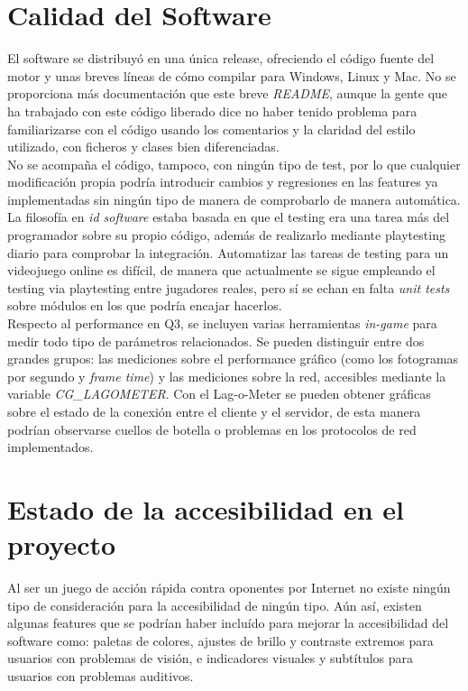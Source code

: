 \documentclass[a4paper,12pt]{report}
\begin{document}
	
	\section{Calidad del Software}
    El software se distribuyó en una única release, ofreciendo el código fuente del motor y unas breves líneas de cómo compilar para Windows, Linux y Mac. No se proporciona más documentación que este breve \textit{README}, aunque la gente que ha trabajado con este código liberado dice no haber tenido problema para familiarizarse con el código usando los comentarios y la claridad del estilo utilizado, con ficheros y clases bien diferenciadas.\\
    
    No se acompaña el código, tampoco, con ningún tipo de test, por lo que cualquier modificación propia podría introducir cambios y regresiones en las features ya implementadas sin ningún tipo de manera de comprobarlo de manera automática. La filosofía en \textit{id software} estaba basada en que el testing era una tarea más del programador sobre su propio código, además de realizarlo mediante playtesting diario para comprobar la integración. Automatizar las tareas de testing para un videojuego online es difícil, de manera que actualmente se sigue empleando el testing via playtesting entre jugadores reales, pero sí se echan en falta \textit{unit tests} sobre módulos en los que podría encajar hacerlos.\\
    
    Respecto al performance en Q3, se incluyen varias herramientas\textit{ in-game }para medir todo tipo de parámetros relacionados. Se pueden distinguir entre dos grandes grupos: las mediciones sobre el performance gráfico (como los fotogramas por segundo y \textit{frame time}) y las mediciones sobre la red, accesibles mediante la variable \textit{CG\_LAGOMETER}. Con el Lag-o-Meter se pueden obtener gráficas sobre el estado de la conexión entre el cliente y el servidor, de esta manera podrían observarse cuellos de botella o problemas en los protocolos de red implementados.
	
	\section{Estado de la accesibilidad en el proyecto}
    Al ser un juego de acción rápida contra oponentes por Internet no existe ningún tipo de consideración para la accesibilidad de ningún tipo. Aún así, existen algunas features que se podrían haber incluído para mejorar la accesibilidad del software como: paletas de colores,  ajustes de brillo y contraste extremos para usuarios con problemas de visión, e indicadores visuales y subtítulos para usuarios con problemas auditivos.
	
\end{document}
